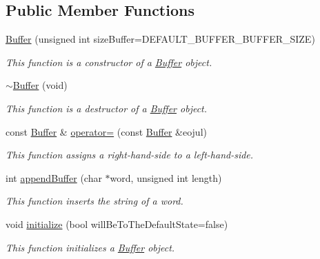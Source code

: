 \subsection*{Public Member Functions}
\begin{CompactItemize}
\item 
\hyperlink{classkmaOrange_1_1Buffer_a8957deac57937576dd6693106ea824a}{Buffer} (unsigned int sizeBuffer=DEFAULT\_\-BUFFER\_\-BUFFER\_\-SIZE)
\begin{CompactList}\small\item\em This function is a constructor of a \hyperlink{classkmaOrange_1_1Buffer}{Buffer} object. \item\end{CompactList}\item 
\hyperlink{classkmaOrange_1_1Buffer_884ca5fae46e971a28b63b901b2330ae}{$\sim$Buffer} (void)
\begin{CompactList}\small\item\em This function is a destructor of a \hyperlink{classkmaOrange_1_1Buffer}{Buffer} object. \item\end{CompactList}\item 
const \hyperlink{classkmaOrange_1_1Buffer}{Buffer} \& \hyperlink{classkmaOrange_1_1Buffer_c68390a0989f7433f7727ae4be023c11}{operator=} (const \hyperlink{classkmaOrange_1_1Buffer}{Buffer} \&eojul)
\begin{CompactList}\small\item\em This function assigns a right-hand-side to a left-hand-side. \item\end{CompactList}\item 
int \hyperlink{classkmaOrange_1_1Buffer_1d59bc9cc086950f9cbebba033c12c7e}{appendBuffer} (char $\ast$word, unsigned int length)
\begin{CompactList}\small\item\em This function inserts the string of a word. \item\end{CompactList}\item 
void \hyperlink{classkmaOrange_1_1Buffer_dd289fa535ca2c9576e0226dbaa93a48}{initialize} (bool willBeToTheDefaultState=false)
\begin{CompactList}\small\item\em This function initializes a \hyperlink{classkmaOrange_1_1Buffer}{Buffer} object. \item\end{CompactList}\item 

\end{CompactItemize}

